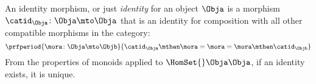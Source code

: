 


%
%

\begin{ctdefinition}\label{def:identity-morphism}
An identity morphism, or just \emph{identity} for an object $\Obja$
is a morphism $	\catid_{\Obja}\colon \Obja \mto \Obja$ that is an identity for composition with all other compatible morphisms in the category:
\begin{equation}
	\prfperiod{
		\mora \colon \Obja \mto \Objb
		}{
			\catid_\Obja \mthen \mora= \mora = \mora \mthen \catid_\Objb
			}
\end{equation}
From the properties of monoids applied to $\HomSet{}\Obja\Obja$, if an identity exists, it is unique.
\end{ctdefinition}

